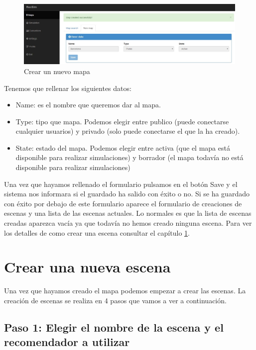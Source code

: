 \begin{figure}[H]
	\centering\includegraphics[scale=0.35]{imagenes/capitulo8/crear-un-nuevo-mapa.jpg}
	\caption{Crear un nuevo mapa}
	\label{img:AddMapa}
\end{figure}

Tenemos que rellenar los siguientes datos:

\begin{itemize}
	\item Name: es el nombre que queremos dar al mapa.
	\item Type: tipo que mapa. Podemos elegir entre publico (puede conectarse cualquier usuarios) y privado (solo puede conectarse el que la ha creado).
	\item State: estado del mapa. Podemos elegir entre activa (que el mapa está disponible para realizar simulaciones) y borrador (el mapa todavía no está disponible para realizar simulaciones)
\end{itemize}

Una vez que hayamos rellenado el formulario pulsamos en el botón Save y el sistema nos informara si el guardado ha salido con éxito o no. Si se ha guardado con éxito por debajo de este formulario aparece el formulario de creaciones de escenas y una lista de las escenas actuales. Lo normales es que la lista de escenas creadas aparezca vacía ya que todavía no hemos creado ninguna escena. Para ver los detalles de como crear una escena consultar el capítulo \ref{sec:crearEscena}.

\section{Crear una nueva escena}\label{sec:crearEscena}
Una vez que hayamos creado el mapa podemos empezar a crear las escenas. La creación de escenas se realiza en 4 pasos que vamos a ver a continuación.

\subsection{Paso 1: Elegir el nombre de la escena y el recomendador a utilizar}


